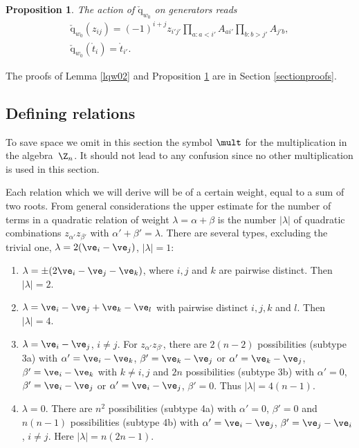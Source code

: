 \documentclass[pdftex]{sigma}
\newtheorem{prop}[theorem]{Proposition}
\def\nplus{\mathfrak{n}}\def\nn{\nonumber}\def\nin{\noindent}
\def\q{\check{\mathrm q}}\def\Q{\mathrm{Q}}\def\r#1{(\ref{#1})}\let\rf=\r
\def\s{z}\def\S{\mathrm {S}}\def\si{\sigma}\def\Sp{\S^{\nplus}}\def\sy{\acute{\sigma}}\def\th{\mathring{h}}
\def\tphi{A}\def\tpsi{A'}\def\tphiplus{B}\def\tpsiminus{B'}\def\ttphi{B}\def\ttpsi{B'}\def\ts{\hskip1pt}\def\tts{\hskip.5pt}
\def\tt{\mathring{t}}\def\U{\mathrm{U}}\def\Uh{\overline{\U}(\h)}\def\UU{\overline{\U}}\def\UUh{{\cal{D}}(\h)}
\numberwithin{equation}{section}
\begin{document}
\begin{prop}\label{paqw0}
The action of $\q_{w_0}$ on generators reads
\begin{gather}
 \label{3.6}
 \q_{w_0}(\s_{ij})=(-1)^{i+j} \s_{i'j'}\prod_{a:a<i'}\tphi_{ai'}
\prod_{b:b>j'}\tphi_{j'b} ,\\
\q_{w_0}(\tt_i)=\tt_{i'} .\label{3.6a}
\end{gather}
\end{prop}

The proofs of Lemma \ref{lqw02} and Proposition \ref{paqw0} are in Section \ref{sectionproofs}.

\subsection{Def\/ining relations}\label{section3.3}

To save  space we omit in this section the symbol $\mult$ for the multiplication in the algebra~$\Z_n$. It should not lead to any confusion since no other multiplication is used in this section.


Each relation which we will derive will be of a certain weight, equal to a sum of two roots. From general considerations the upper estimate
for the number of terms in a quadratic relation of weight $\lambda=\alpha+\beta$ is the number $|\lambda|$ of quadratic combinations $\s_{\alpha'}\s_{\beta'}$
with $\alpha'+\beta'=\lambda$.
There are several types, excluding the trivial one, $\lambda=2(\ve_i-\ve_j)$, $|\lambda|=1$:
\begin{enumerate}\itemsep=0pt
\item $\lambda=\pm(2\ve_i-\ve_j-\ve_k)$, where $i,j$ and $k$ are pairwise distinct. Then $|\lambda|=2$.
\item $\lambda=\ve_i-\ve_j+\ve_k-\ve_l$ with pairwise distinct $i,j,k$ and $l$. Then $|\lambda|=4$.
\item $\lambda=\ve_i-\ve_j$, $i\neq j$. For $\s_{\alpha'}\s_{\beta'}$, there are $2(n-2)$ possibilities (subtype 3a) with $\alpha'=\ve_i-\ve_k$,
$\beta'=\ve_k-\ve_j$ or $\alpha'=\ve_k-\ve_j$, $\beta'=\ve_i-\ve_k$ with $k\neq i,j$ and $2n$ possibilities (subtype 3b) with $\alpha'=0$,
$\beta'=\ve_i-\ve_j$ or $\alpha'=\ve_i-\ve_j$, $\beta'=0$. Thus $|\lambda|=4(n-1)$.
\item $\lambda=0$. There are $n^2$ possibilities (subtype 4a) with $\alpha'=0$, $\beta'=0$ and $n(n-1)$ possibilities (subtype 4b) with
$\alpha'=\ve_i-\ve_j$,  $\beta'=\ve_j-\ve_i$, $i\neq j$. Here $|\lambda|=n(2n-1)$.
\end{enumerate}
\end{document}
